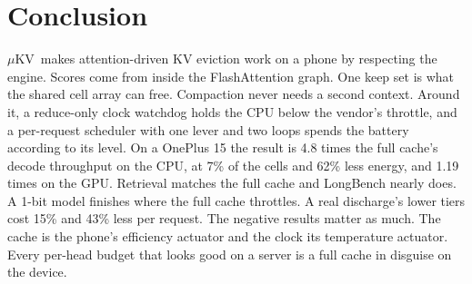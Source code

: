 \documentclass[sigconf, anonymous=false, screen=true]{acmart}
\newcommand{\muKV}{$\mu$KV}
\begin{document}
\section{Conclusion}
\label{sec:conclusion}

\muKV\ makes attention-driven KV eviction work on a phone by respecting the engine. Scores come from inside the FlashAttention graph. One keep set is what the shared cell array can free. Compaction never needs a second context. Around it, a reduce-only clock watchdog holds the CPU below the vendor's throttle, and a per-request scheduler with one lever and two loops spends the battery according to its level. On a OnePlus 15 the result is 4.8 times the full cache's decode throughput on the CPU, at 7\% of the cells and 62\% less energy, and 1.19 times on the GPU. Retrieval matches the full cache and LongBench nearly does. A 1-bit model finishes where the full cache throttles. A real discharge's lower tiers cost 15\% and 43\% less per request. The negative results matter as much. The cache is the phone's efficiency actuator and the clock its temperature actuator. Every per-head budget that looks good on a server is a full cache in disguise on the device.
\end{document}

